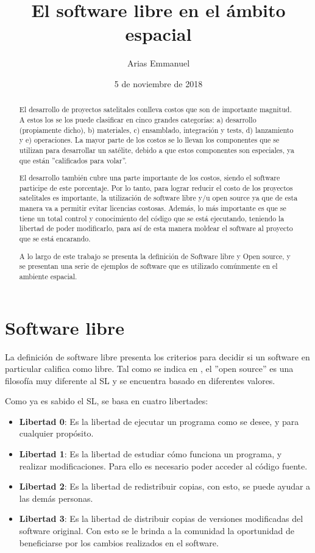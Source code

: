 \documentclass[12pt]{article}
\title{El software libre en el ámbito espacial}
\author{Arias Emmanuel}
\date{5 de noviembre de 2018}
\begin{document}
\maketitle
\newpage

\begin{abstract}
	El desarrollo de proyectos satelitales conlleva costos que son de importante magnitud. A estos los se los puede clasificar en cinco grandes categorías: a) desarrollo (propiamente dicho), b) materiales, c) ensamblado, integración y tests, d) lanzamiento y e) operaciones. La mayor parte de los costos se lo llevan los componentes que se utilizan para desarrollar un satélite, debido a que estos componentes son especiales, ya que están ''calificados para volar''. 
	
	El desarrollo también cubre una parte importante de los costos, siendo el software participe de este porcentaje. Por lo tanto, para lograr reducir el costo de los proyectos satelitales es importante, la utilización de software libre y/u open source ya que de esta manera va a permitir evitar licencias costosas. Además, lo más importante es que se tiene un total control y conocimiento del código que se está ejecutando, teniendo la libertad de poder modificarlo, para así de esta manera moldear el software al proyecto que se está encarando.
	
	A lo largo de este trabajo se presenta la definición de Software libre y Open source, y se presentan una serie de ejemplos de software que es utilizado comúnmente en el ambiente espacial. 
\end{abstract}

\section{Software libre}
La definición de software libre presenta los criterios para decidir si un software en particular califica como libre. Tal como se indica en \cite{freesw}, el ''open source'' es una filosofía muy diferente al SL y se encuentra basado en diferentes valores. 

Como  ya es sabido el SL, se basa en cuatro libertades:
\begin{itemize}
	\item \textbf{Libertad 0}: Es la libertad de ejecutar un programa como se desee, y para cualquier propósito.
	\item \textbf{Libertad 1}: Es la libertad de estudiar cómo funciona un programa, y realizar modificaciones. Para ello es necesario poder acceder al código fuente. 
	\item \textbf{Libertad 2}: Es la libertad de redistribuir copias, con esto, se puede ayudar a las demás personas. 
	\item \textbf{Libertad 3}: Es la libertad de distribuir copias de versiones modificadas del software original. Con esto se le brinda a la comunidad la oportunidad de beneficiarse por los cambios realizados en el software. 
\end{itemize}
\end{document}

